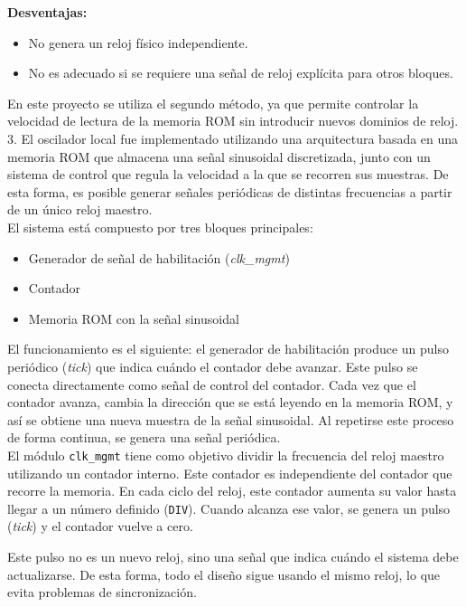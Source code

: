 \documentclass[letterpaper, 12pt]{article}
\begin{document}
\textbf{Desventajas:}
\begin{itemize}
    \item No genera un reloj físico independiente.
    \item No es adecuado si se requiere una señal de reloj explícita para otros bloques.
\end{itemize}

En este proyecto se utiliza el segundo método, ya que permite controlar la velocidad de lectura de la memoria ROM sin introducir nuevos dominios de reloj.\\

3. El oscilador local fue implementado utilizando una arquitectura basada en una memoria ROM que almacena una señal sinusoidal discretizada, junto con un sistema de control que regula la velocidad a la que se recorren sus muestras. De esta forma, es posible generar señales periódicas de distintas frecuencias a partir de un único reloj maestro.\\

El sistema está compuesto por tres bloques principales:

\begin{itemize}
    \item Generador de señal de habilitación (\textit{clk\_mgmt})
    \item Contador
    \item Memoria ROM con la señal sinusoidal
\end{itemize}

El funcionamiento es el siguiente: el generador de habilitación produce un pulso periódico (\textit{tick}) que indica cuándo el contador debe avanzar. Este pulso se conecta directamente como señal de control del contador. Cada vez que el contador avanza, cambia la dirección que se está leyendo en la memoria ROM, y así se obtiene una nueva muestra de la señal sinusoidal. Al repetirse este proceso de forma continua, se genera una señal periódica.\\

El módulo \texttt{clk\_mgmt} tiene como objetivo dividir la frecuencia del reloj maestro utilizando un contador interno. Este contador es independiente del contador que recorre la memoria. En cada ciclo del reloj, este contador aumenta su valor hasta llegar a un número definido (\texttt{DIV}). Cuando alcanza ese valor, se genera un pulso (\textit{tick}) y el contador vuelve a cero.

Este pulso no es un nuevo reloj, sino una señal que indica cuándo el sistema debe actualizarse. De esta forma, todo el diseño sigue usando el mismo reloj, lo que evita problemas de sincronización.
\end{document}
